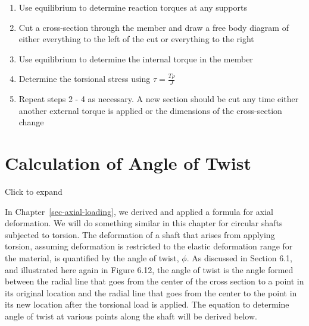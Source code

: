 \documentclass[
  letterpaper,
  DIV=11,
  numbers=noendperiod]{scrreprt}
\theoremstyle{definition}
\theoremstyle{remark}
\begin{document}
\begin{tcolorbox}[enhanced jigsaw, leftrule=.75mm, colbacktitle=quarto-callout-warning-color!10!white, breakable, opacityback=0, colback=white, titlerule=0mm, toprule=.15mm, colframe=quarto-callout-warning-color-frame, coltitle=black, title={Step-by-step: Torsional stress}, toptitle=1mm, bottomrule=.15mm, rightrule=.15mm, left=2mm, arc=.35mm, opacitybacktitle=0.6, bottomtitle=1mm]

\begin{enumerate}
\def\labelenumi{\arabic{enumi}.}
\item
  Use equilibrium to determine reaction torques at any supports
\item
  Cut a cross-section through the member and draw a free body diagram of
  either everything to the left of the cut or everything to the right
\item
  Use equilibrium to determine the internal torque in the member
\item
  Determine the torsional stress using \(\tau=\frac{T\rho}{J}\)
\item
  Repeat steps 2 - 4 as necessary. A new section should be cut any time
  either another external torque is applied or the dimensions of the
  cross-section change
\end{enumerate}

\end{tcolorbox}

\section{Calculation of Angle of Twist}\label{sec-6.2}

Click to expand

In Chapter~\ref{sec-axial-loading}, we derived and applied a formula for
axial deformation. We will do something similar in this chapter for
circular shafts subjected to torsion. The deformation of a shaft that
arises from applying torsion, assuming deformation is restricted to the
elastic deformation range for the material, is quantified by the angle
of twist, \(\phi\). As discussed in Section 6.1, and illustrated here
again in Figure 6.12, the angle of twist is the angle formed between the
radial line that goes from the center of the cross section to a point in
its original location and the radial line that goes from the center to
the point in its new location after the torsional load is applied. The
equation to determine angle of twist at various points along the shaft
will be derived below.
\end{document}
